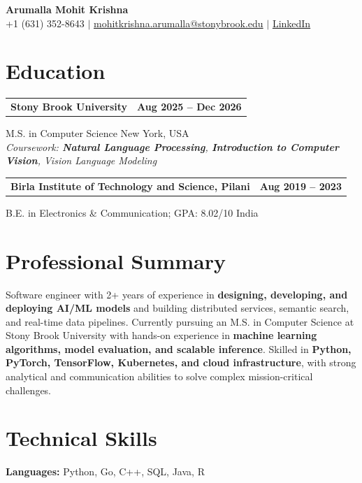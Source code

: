 \documentclass[letterpaper,10pt]{article}
\makeatletter
\newcommand{\entry}[2]{%
  \noindent
  \begin{tabularx}{\linewidth}
    {@{}>{\raggedright\arraybackslash}X@{\hspace{6pt}}r@{}}
    \textbf{#1} & #2
  \end{tabularx}\par
}
\makeatother
\begin{document}
\begin{center}
    {\LARGE\bfseries Arumalla Mohit Krishna}\\[3pt]
    +1 (631) 352-8643 $|$
    \href{mailto:mohitkrishna.arumalla@stonybrook.edu}
    {mohitkrishna.arumalla@stonybrook.edu} $|$
    \href{https://linkedin.com/in/mohit-krishna-arumalla}
    {LinkedIn}
\end{center}
\vspace{-8pt}

\section{Education}

\entry
  {\textbf{Stony Brook University}}
  {\textbf{Aug 2025 -- Dec 2026}}

M.S. in Computer Science \hfill New York, USA\\
\textit{
Coursework: \textbf{Natural Language Processing},
\textbf{Introduction to Computer Vision}, Vision Language Modeling
}
\vspace{3pt}

\entry
  {\textbf{Birla Institute of Technology and Science, Pilani}}
  {\textbf{Aug 2019 -- 2023}}

B.E. in Electronics \& Communication; GPA: 8.02/10 \hfill India
\section{Professional Summary}

Software engineer with 2+ years of experience in \textbf{designing, developing, and deploying AI/ML models} and building distributed services, semantic search, and real-time data pipelines. Currently pursuing an M.S. in Computer Science at Stony Brook University with hands-on experience in \textbf{machine learning algorithms, model evaluation, and scalable inference}. Skilled in \textbf{Python, PyTorch, TensorFlow, Kubernetes, and cloud infrastructure}, with strong analytical and communication abilities to solve complex mission-critical challenges.

\section{Technical Skills}

\textbf{Languages:}
Python, Go, C++, SQL, Java, R\\
\end{document}
